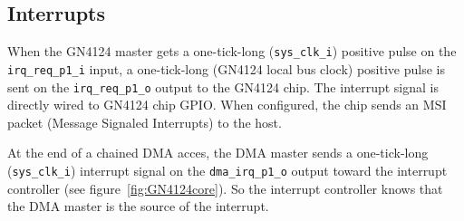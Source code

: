 \documentclass[10pt,a4paper]{cerndoc}
\begin{document}
   \subsection{Interrupts}
   When the GN4124 master gets a one-tick-long (\verb+sys_clk_i+) positive pulse on the \verb+irq_req_p1_i+ input, a one-tick-long (GN4124 local bus clock) positive pulse is sent on the \verb+irq_req_p1_o+ output to the GN4124 chip. The interrupt signal is directly wired to GN4124 chip GPIO. When configured, the chip sends an MSI packet (Message Signaled Interrupts) to the host.
   
   At the end of a chained DMA acces, the DMA master sends a one-tick-long (\verb+sys_clk_i+) interrupt signal on the \verb+dma_irq_p1_o+ output toward the interrupt controller (see figure~\ref{fig:GN4124core}). So the interrupt controller knows that the DMA master is the source of the interrupt.
\end{document}
